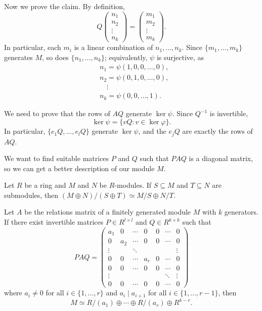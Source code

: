 Now we prove the claim. By definition, 
\[
Q\begin{pmatrix}
n_1\\
n_2\\
\vdots\\
n_k	
\end{pmatrix}
=\begin{pmatrix}
m_1\\
m_2\\
\vdots\\
m_k
\end{pmatrix}.
\]
In particular, 
each $m_i$ is a linear combination of $n_1,\dots,n_k$. Since 
$\{m_1,\dots,m_k\}$ generates $M$, so does $\{n_1,\dots,n_k\}$; equivalently, 
$\psi$ is surjective, as 
\begin{align*}
&n_1=\psi(1,0,0,\dots,0),\\
&n_2=\psi(0,1,0,\dots,0),\\
&\quad\vdots\\
&n_k=\psi(0,0,\dots,1).
\end{align*}

We need to prove that the rows of $AQ$ generate $\ker\psi$. 
Since $Q^{-1}$ is invertible, 
\[
\ker\psi=\{vQ:v\in\ker\varphi\}.
\]
In particular, $\{e_1Q,\dots,e_lQ\}$ generate $\ker\psi$, and
the $e_jQ$ are exactly the rows of $AQ$. 

We want to find suitable matrices $P$ and $Q$ 
such that $PAQ$ is a diagonal matrix, so we can 
get a better description of our module $M$. 

\begin{exercise}
\label{xca:easy_submodules}
    Let $R$ be a ring and $M$ and $N$ be $R$-modules. 
    If $S\subseteq M$ and $T\subseteq N$ are submodules, then 
    $(M\oplus N)/(S\oplus T)\simeq M/S\oplus N/T$. 
\end{exercise}

\begin{proposition}
	Let $A$ be the relations matrix of a finitely generated module $M$ with $k$ generators. 
	If there exist invertible matrices $P\in R^{l\times l}$ 
	and $Q\in R^{k\times k}$ such that 
	\[
		PAQ=
		\begin{pmatrix}
			a_1 & 0 & \cdots & 0 & 0 & \cdots & 0\\
			0 & a_2 & \cdots & 0 & 0 & \cdots & 0\\
			\vdots && \ddots &  & & & \vdots\\	
			0 & 0 & \cdots & a_r & 0 & \cdots & 0\\	
			0 & 0 & \cdots & 0 & 0 & \cdots & 0\\	
			\vdots &&&&&\ddots &\vdots\\
			0 & 0 & \cdots & 0 & 0 & \cdots & 0
		\end{pmatrix}
	\]
	where $a_i\ne0$ for all $i\in\{1,\dots,r\}$ and  $a_i\mid a_{i+1}$ for all
	$i\in\{1,\dots,r-1\}$,  then 
	\[
		M\simeq R/(a_1)\oplus\cdots\oplus R/(a_r)\oplus R^{k-r}.
	\]
\end{proposition}

